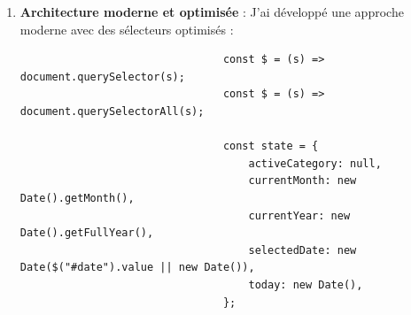 \documentclass[a4paper,11pt]{article}
\begin{document}
                \begin{enumerate}
                    \item \textbf{Architecture moderne et optimisée} :
                        \noindent J'ai développé une approche moderne avec des sélecteurs optimisés :
                        \begin{tcolorbox}[colback=lightgray!5, colframe=gray!80, left=-50mm, right=5mm, top=2mm, bottom=0mm, boxrule=0.1mm]
                            \begin{verbatim}
                                const $ = (s) => document.querySelector(s);
                                const $ = (s) => document.querySelectorAll(s);

                                const state = {
                                    activeCategory: null,
                                    currentMonth: new Date().getMonth(),
                                    currentYear: new Date().getFullYear(),
                                    selectedDate: new Date($("#date").value || new Date()),
                                    today: new Date(),
                                };
                            \end{verbatim}
                        \end{tcolorbox}


\end{enumerate}
\end{document}
